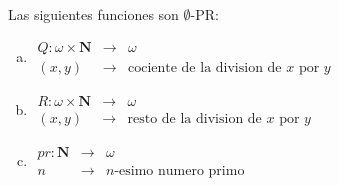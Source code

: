   \begin{lemma}
    \par Las siguientes funciones son $\emptyset$-PR:

    \begin{enumerate}[a)]
      \item
        $\begin{array}{rll}
          Q: \omega \times \mathbf{N} &\rightarrow& \omega \\
          (x,y) & \rightarrow & \text{cociente de la division de } x \text{ por } y
        \end{array}$
      \item
        $\begin{array}{rll}
          R: \omega \times \mathbf{N} &\rightarrow& \omega \\
          (x,y) &\rightarrow& \text{resto de la division de } x \text{ por } y
        \end{array}$
      \item
        $\begin{array}{rll}
          pr: \mathbf{N} &\rightarrow& \omega \\
          n & \rightarrow & n\text{-esimo numero primo}
        \end{array}$
    \end{enumerate}
  \end{lemma}
